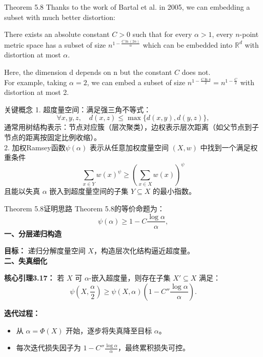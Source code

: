 \documentclass[xcolor=dvipsnames]{beamer}
\theoremstyle{remark}
\begin{document}
\begin{frame}{Theorem 5.8}
  \hspace*{1em}Thanks to the work of Bartal et al. in 2005, we can embedding a subset with much better distortion:\\
    \begin{theorem}
      There exists an absolute constant $C > 0$ such that for every $\alpha > 1$, every $n$-point metric space has a subset of size $n^{1 - \frac{C \ln(2\alpha)}{\alpha}}$ which can be embedded into $\mathbb{R}^d$ with distortion at most $\alpha$.
    \end{theorem}
    \hspace*{1em}Here, the dimension d depends on n but the constant $C$ does not.\\
    \hspace*{1em}For example, taking $\alpha = 2$, we can embed a subset of size $n^{1 - \frac{C \ln 4}{2}} = n^{1 - \frac{C}{2}}$ with distortion at most 2.\\
\end{frame}
\begin{frame}{关键概念}
 1. 超度量空间：满足强三角不等式：
 \[
 \forall x, y, z,\quad d(x, z) \leq \max\{d(x, y), d(y, z)\},
 \]
 通常用树结构表示：节点对应簇（层次聚类），边权表示层次距离（如父节点到子节点的距离按固定比例收缩）。\\
 2. 加权Ramsey函数\(\psi(\alpha)\) 表示从任意加权度量空间 \((X, w)\) 中找到一个满足权重条件
\[
\sum_{x \in Y} w(x)^{\psi} \geq \left( \sum_{x \in X} w(x) \right)^{\psi}
\]
且能以失真 \(\alpha\) 嵌入到超度量空间的子集 \(Y \subseteq X\) 的最小指数。\\

\end{frame}
\begin{frame}{Theorem 5.8证明思路}
  Theorem 5.8的等价命题为：
\[
\psi(\alpha) \geq 1 - C \frac{\log \alpha}{\alpha},
\]
  \textbf{一、分层递归构造}  
  \vspace{0.1cm}
  
  \textbf{目标：} 递归分解度量空间 \( X \)，构造层次化结构逼近超度量。\\
  \textbf{\large 二、失真细化}  
  \vspace{0.1cm}
  
  \textbf{核心引理3.17：} 若 \( X \) 可 \( \alpha \)-嵌入超度量，则存在子集 \( X' \subseteq X \) 满足：
  \[
  \psi\left(X, \frac{\alpha}{2}\right) \geq \psi(X, \alpha) \left(1 - C'' \frac{\log \alpha}{\alpha}\right).
  \]
  
  \textbf{迭代过程：}
  \begin{itemize}
      \item 从 \( \alpha = \Phi(X) \) 开始，逐步将失真降至目标 \( \alpha \)。
      \item 每次迭代损失因子为 \( 1 - C'' \frac{\log \alpha}{\alpha} \)，最终累积损失可控。
  \end{itemize}
   \end{frame}
    
\end{document}
